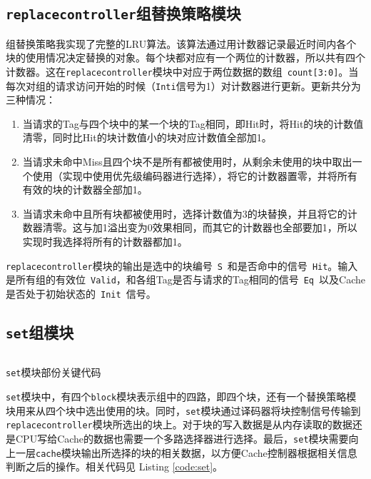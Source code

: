 \documentclass[12pt,a4paper]{article}
\newcommand{\incode}[1]{\texttt{#1}} %
\newcommand{\codefile}[1]{\inputminted[bgcolor=bg,linenos,tabsize=4]{verilog}{code/#1}} %
\begin{document}
\subsection{\incode{replacecontroller}组替换策略模块}

组替换策略我实现了完整的LRU算法。该算法通过用计数器记录最近时间内各个块的使用情况决定替换的对象。每个块都对应有一个两位的计数器，所以共有四个计数器。这在\incode{replacecontroller}模块中对应于两位数据的数组\ \incode{count[3:0]}。当每次对组的请求访问开始的时候（\incode{Inti}信号为1）对计数器进行更新。更新共分为三种情况：
\begin{enumerate}
  \item 当请求的Tag与四个块中的某一个块的Tag相同，即Hit时，将Hit的块的计数值清零，同时比Hit的块计数值小的块对应计数值全部加1。
  \item 当请求未命中Miss且四个块不是所有都被使用时，从剩余未使用的块中取出一个使用（实现中使用优先级编码器进行选择），将它的计数器置零，并将所有有效的块的计数器全部加1。
  \item 当请求未命中且所有块都被使用时，选择计数值为3的块替换，并且将它的计数器清零。这与加1溢出变为0效果相同，而其它的计数器也全部要加1，所以实现时我选择将所有的计数器都加1。
\end{enumerate}

\incode{replacecontroller}模块的输出是选中的块编号\ \incode{S}\ 和是否命中的信号\ \incode{Hit}。输入是所有组的有效位\ \incode{Valid}，和各组Tag是否与请求的Tag相同的信号\ \incode{Eq}\ 以及Cache是否处于初始状态的\ \incode{Init}\ 信号。

\subsection{\incode{set}组模块}

\begin{listing}[htb]
	\codefile{set.v}
	\caption{\incode{set}模块部份关键代码}
	\label{code:set}
\end{listing}

\incode{set}模块中，有四个\incode{block}模块表示组中的四路，即四个块，还有一个替换策略模块用来从四个块中选出使用的块。同时，\incode{set}模块通过译码器将块控制信号传输到\incode{replacecontroller}模块所选出的块上。对于块的写入数据是从内存读取的数据还是CPU写给Cache的数据也需要一个多路选择器进行选择。最后，\incode{set}模块需要向上一层\incode{cache}模块输出所选择的块的相关数据，以方便Cache控制器根据相关信息判断之后的操作。相关代码见 Listing \ref{code:set}。
\end{document}
